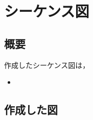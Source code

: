 \documentclass[documentclass]{jsarticle}
\begin{document}
\newpage

\section{シーケンス図}
\subsection*{概要}
作成したシーケンス図は，
\begin{itemize}
  \item 
\end{itemize}


\subsection*{作成した図}

\end{document}

